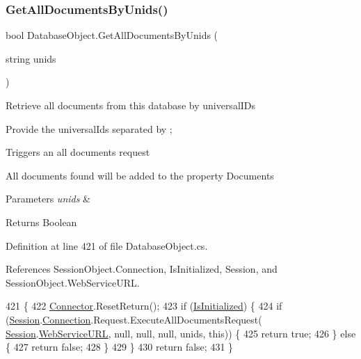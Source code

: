 \subsubsection{\texorpdfstring{Get\+All\+Documents\+By\+Unids()}{GetAllDocumentsByUnids()}\hspace{0.1cm}{\footnotesize\ttfamily [1/2]}}
{\footnotesize\ttfamily bool Database\+Object.\+Get\+All\+Documents\+By\+Unids (\begin{DoxyParamCaption}\item[{string}]{unids }\end{DoxyParamCaption})}



Retrieve all documents from this database by universal\+I\+Ds 

Provide the universal\+Ids separated by ;

Triggers an all documents request

All documents found will be added to the property \textquotesingle{}Documents\textquotesingle{}


\begin{DoxyParams}{Parameters}
{\em unids} & \\
\hline
\end{DoxyParams}
\begin{DoxyReturn}{Returns}
Boolean
\end{DoxyReturn}


Definition at line 421 of file Database\+Object.\+cs.



References Session\+Object.\+Connection, Is\+Initialized, Session, and Session\+Object.\+Web\+Service\+U\+RL.


\begin{DoxyCode}
421                                                      \{
422         \mbox{\hyperlink{class_connector}{Connector}}.ResetReturn();
423         \textcolor{keywordflow}{if} (\mbox{\hyperlink{class_database_object_a5fe036d32a30eb10d1b3f6a30263f740}{IsInitialized}}) \{
424             \textcolor{keywordflow}{if} (\mbox{\hyperlink{class_database_object_aa8484162b7d2a7c4c9426bca13c64c07}{Session}}.\mbox{\hyperlink{class_session_object_a014bdbf705a753540e19bfb53030c55c}{Connection}}.Request.ExecuteAllDocumentsRequest(
      \mbox{\hyperlink{class_database_object_aa8484162b7d2a7c4c9426bca13c64c07}{Session}}.\mbox{\hyperlink{class_session_object_a697c071c812fbf7ad1166b896fb44c16}{WebServiceURL}}, null, null, null, unids, \textcolor{keyword}{this})) \{
425                 \textcolor{keywordflow}{return} \textcolor{keyword}{true};
426             \} \textcolor{keywordflow}{else} \{
427                 \textcolor{keywordflow}{return} \textcolor{keyword}{false};
428             \}
429         \}
430         \textcolor{keywordflow}{return} \textcolor{keyword}{false};
431     \}
\end{DoxyCode}
\mbox{\label{class_database_object_a92e80ea30e83cddf47f29d0f502b81c5}} 
